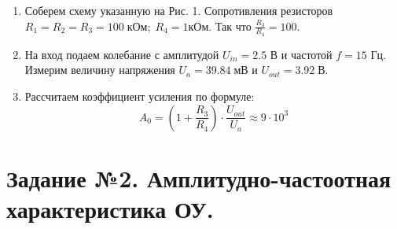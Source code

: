\documentclass[a4paper]{article}
\begin{document}
    
\begin{enumerate}
    \item Соберем схему указанную на Рис. 1. Сопротивления резисторов $R_1 = R_2 = R_3 = 100 \; кОм ; \; R_4 = 1кОм$. Так что $\frac{R_3}{R_4} = 100$. 
    \item На вход подаем колебание с амплитудой $U_{in} = 2.5$ В и частотой $f = 15$ Гц. Измерим величину напряжения $U_a = 39.84 \;мВ$ и $ U_{out} = 3.92 \; В$.
    \item Рассчитаем коэффициент усиления по формуле:
    \begin{equation}
       A_0 = (1+\frac{R_3}{R_4})\cdot \frac{U_{out}}{U_a} \approx 9 \cdot 10^3
    \end{equation}

\end{enumerate}

\section{Задание №2. Амплитудно-частоотная характеристика ОУ.}

\end{document}
